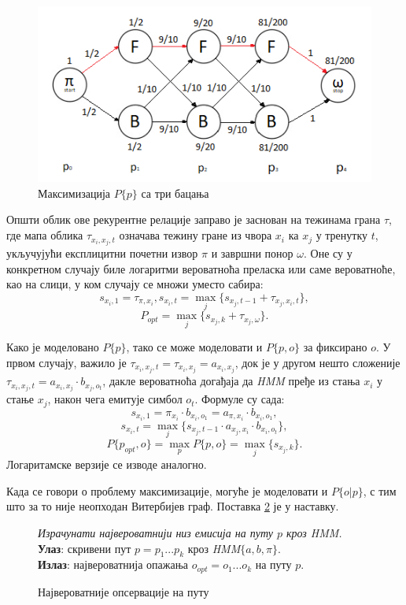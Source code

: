 \documentclass[12pt,oneside]{memoir}
\newenvironment{problem}[1][!ht]
{\renewcommand{\algorithmcfname}{Проблем}
\begin{figure}[!ht]
\centering
  \begin{minipage}{.94\linewidth}
	\begin{algorithm}[#1]%
  }{\end{algorithm}
  \end{minipage}
\end{figure}}
\begin{document}
\begin{CJK}{UTF8}{ipxm}
\begin{figure}[H]
  \centering
  \includegraphics[width=.9\textwidth]{tri_bacanja.png}
  \caption{Максимизација $P\{p\}$ са три бацања}
  \label{fig:tribac}
\end{figure}

Општи облик ове рекурентне релације заправо је заснован на тежинама грана $\tau$, где мапа облика $\tau_{x_i, x_j, t}$ означава тежину гране из чвора $x_i$ ка $x_j$ у тренутку $t$, укључујући експлицитни почетни извор $\pi$ и завршни понор $\omega$. Оне су у конкретном случају биле логаритми вероватноћа преласка или саме вероватноће, као на слици, у ком случају се множи уместо сабира: $$s_{x_i, 1} = \tau_{\pi, x_i}, s_{x_i, t} = \max_j \{s_{x_j, t-1} + \tau_{x_j, x_i, t}\},$$ $$P_{opt} = \max_j \{s_{x_j, k} + \tau_{x_j, \omega}\}.$$

Како је моделовано $P\{p\}$, тако се може моделовати и $P\{p, o\}$ за фиксирано $o$. У првом случају, важило је $\tau_{x_i, x_j, t} = \tau_{x_i, x_j} = a_{x_i, x_j}$, док је у другом нешто сложеније $\tau_{x_i, x_j, t} = a_{x_i, x_j} \cdot b_{x_j, o_t}$, дакле вероватноћа догађаја да \textit{HMM} пређе из стања $x_i$ у стање $x_j$, након чега емитује симбол $o_t$. Формуле су сада: $$s_{x_i, 1} = \pi_{x_i} \cdot b_{x_i, o_1} = a_{\pi, x_i} \cdot b_{x_i, o_1},$$ $$s_{x_i, t} = \max_j \{s_{x_j, t-1} \cdot a_{x_j, x_i} \cdot b_{x_i, o_t}\},$$ $$P\{p_{opt}, o\} = \max_p P\{p, o\} = \max_j \{s_{x_j, k}\}.$$ Логаритамске верзије се изводе аналогно.

Када се говори о проблему максимизације, могуће је моделовати и $P\{o | p\}$, с тим што за то није неопходан Витербијев граф. Поставка \ref{prob:maxpops} је у наставку.

\begin{problem}[H]
  \SetAlgoLined
  \textit{Израчунати највероватнији низ емисија на путу $p$ кроз \textit{HMM}.}\\
  \textbf{Улаз}: скривени пут $p = p_1...p_k$ кроз \textit{HMM}$\{a, b, \pi\}$.\\
  \textbf{Излаз}: највероватнија опажања $o_{opt} = o_1...o_k$ на путу $p$.
  \caption{Највероватније опсервације на путу}
  \label{prob:maxpops}
\end{problem}


\end{CJK}
\end{document}
